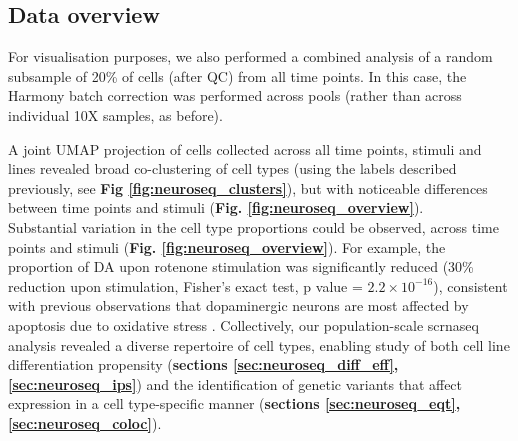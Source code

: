



\newpage

\subsection{Data overview}

For visualisation purposes, we also performed a combined analysis of a random subsample of 20\% of cells (after QC) from all time points.
In this case, the Harmony batch correction was performed across pools (rather than across individual 10X samples, as before).

A joint UMAP projection of cells collected across all time points, stimuli and lines revealed broad co-clustering of cell types (using the labels described previously, see \textbf{Fig \ref{fig:neuroseq_clusters}}), but with noticeable differences between time points and stimuli (\textbf{Fig. \ref{fig:neuroseq_overview}}). \\

Substantial variation in the cell type proportions could be observed, across time points and stimuli (\textbf{Fig. \ref{fig:neuroseq_overview}}). 
For example, the proportion of DA upon rotenone stimulation was significantly reduced (30\% reduction upon stimulation, Fisher’s exact test, p value = $2.2 \times 10^{-16}$), consistent with previous observations that dopaminergic neurons are most affected by apoptosis due to oxidative stress \cite{sherer2003mechanism, knonagel1992autologous, cannon2009highly}.
Collectively, our population-scale \gls{scrnaseq} analysis revealed a diverse repertoire of cell types, enabling study of both cell line differentiation propensity (\textbf{sections \ref{sec:neuroseq_diff_eff}, \ref{sec:neuroseq_ips}}) and the identification of genetic variants that affect expression in a cell type-specific manner (\textbf{sections \ref{sec:neuroseq_eqt}, \ref{sec:neuroseq_coloc}}). 
\\ 

